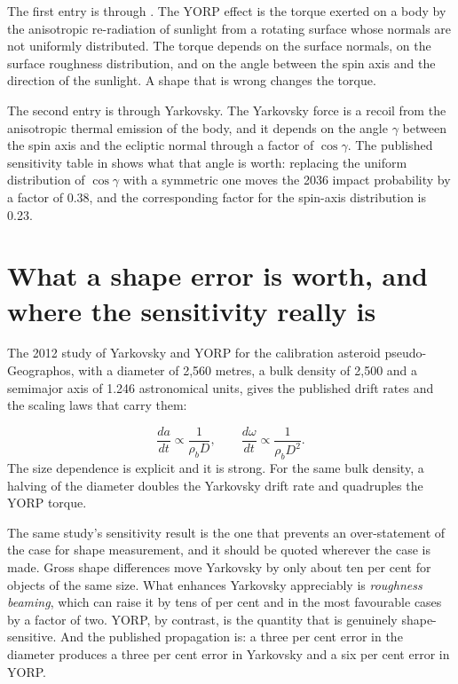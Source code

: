 The first entry is through . The YORP effect is the torque exerted on a
body by the anisotropic re-radiation of sunlight from a rotating surface
whose normals are not uniformly distributed. The torque depends on the
surface normals, on the surface roughness distribution, and on the angle
between the spin axis and the direction of the sunlight. A shape that is
wrong changes the torque.

The second entry is through Yarkovsky. The Yarkovsky force is a recoil from
the anisotropic thermal emission of the body, and it depends on the angle
\(\gamma\) between the spin axis and the ecliptic normal through a factor
of \(\cos\gamma\). The published sensitivity table in
 shows what that angle is worth: replacing the uniform
distribution of \(\cos\gamma\) with a symmetric one moves the 2036 impact
probability by a factor of 0.38, and the corresponding factor for the
spin-axis distribution is 0.23.

\section{What a shape error is worth, and where the sensitivity really is}

The 2012 study of Yarkovsky and YORP for the calibration asteroid
pseudo-Geographos, with a diameter of 2,560 metres, a bulk density of 2,500
and a semimajor axis of 1.246 astronomical units, gives the published drift
rates and the scaling laws that carry them:

\begin{equation}
\frac{d a}{d t} \propto \frac{1}{\rho_b D},
\qquad
\frac{d \omega}{d t} \propto \frac{1}{\rho_b D^{2}}.
\label{eq:rg-scaling}
\end{equation}
The size dependence is explicit and it is strong. For the same bulk density,
a halving of the diameter doubles the Yarkovsky drift rate and quadruples
the YORP torque.

The same study's sensitivity result is the one that prevents an
over-statement of the case for shape measurement, and it should be quoted
wherever the case is made. Gross shape differences move Yarkovsky by only
about ten per cent for objects of the same size. What enhances Yarkovsky
appreciably is \emph{roughness beaming}, which can raise it by tens of per
cent and in the most favourable cases by a factor of two. YORP, by
contrast, is the quantity that is genuinely shape-sensitive. And the
published propagation is: a three per cent error in the diameter produces a
three per cent error in Yarkovsky and a six per cent error in YORP.

